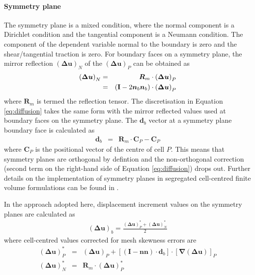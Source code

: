\documentclass[sn-mathphys,Numbered]{sn-jnl}%
\newcommand{\bb}{\boldsymbol}
\begin{document}
\paragraph{Symmetry plane}
The symmetry plane is a mixed condition, where the normal component is a Dirichlet condition and the tangential component is a Neumann condition.
The component of the dependent variable normal to the boundary is zero and the shear/tangential traction is zero.
For boundary faces on a symmetry plane, the mirror reflection $\left(\bb{\Delta} \bb{u}\right)_N$ of the $\left(\bb{\Delta} \bb{u}\right)_P$ can be obtained as
\begin{eqnarray}
	\left(\bb{\Delta} \bb{u}\right)_N &=& \bb{R}_m \cdot \left(\bb{\Delta} \bb{u}\right)_P \notag \\
		&=& \left(\textbf{I} - 2 \bb{n}_b \bb{n}_b \right) \cdot \left(\bb{\Delta} \bb{u}\right)_P
\end{eqnarray}
where $\bb{R}_m$ is termed the reflection tensor.
The discretisation in Equation \ref{eq:diffusion} takes the same form with the mirror reflected values used at boundary faces on the symmetry plane.
The $\bb{d}_b$ vector at a symmetry plane boundary face is calculated as
\begin{eqnarray}
	 \bb{d}_b &=& \bb{R}_m \cdot \bb{C}_P - \bb{C}_P
\end{eqnarray}
where $\bb{C}_P$ is the positional vector of the centre of cell $P$.
This means that symmetry planes are orthogonal by defintion and the non-orthogonal correction (second term on the right-hand side of Equation \ref{eq:diffusion}) drops out.
Further details on the implementation of symmetry planes in segregated cell-centred finite volume formulations can be found in \citet{Demirdzic2022}.

In the approach adopted here, displacement increment values on the symmetry planes are calculated as
\begin{eqnarray}
	\left(\bb{\Delta} \bb{u}\right)_b = \frac{\left(\bb{\Delta} \bb{u}\right)_P^* + \left(\bb{\Delta} \bb{u}\right)_N^*}{2}
\end{eqnarray}
where cell-centred values corrected for mesh skewness errors are
\begin{eqnarray}
	 \left(\bb{\Delta} \bb{u}\right)_P^* &=&
	 	\left(\bb{\Delta} \bb{u}\right)_P + \left[ (\textbf{I} - \bb{n}\bb{n}) \cdot \bb{d}_b \right] \cdot \left[ \bb{\nabla} \left(\bb{\Delta} \bb{u}\right) \right]_P \\
	 \left(\bb{\Delta} \bb{u}\right)_N^* &=& \bb{R}_m \cdot \left(\bb{\Delta} \bb{u}\right)_P^*
\end{eqnarray}
\end{document}
